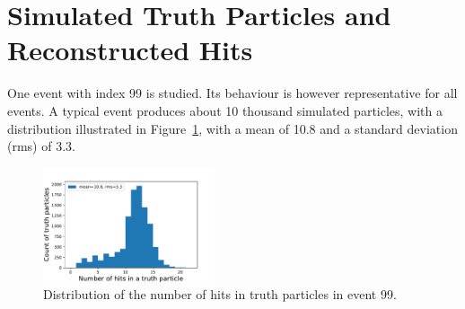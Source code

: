 \section{Simulated Truth Particles and Reconstructed Hits}

One event with index 99 is studied. Its behaviour is however representative for all events. A typical event produces about 10 thousand simulated particles, with a distribution illustrated in Figure~\ref{fig:TruthParticleNbHits}, with a mean of 10.8 and a standard deviation (rms) of 3.3.

\begin{figure}[htb]
\centering
\includegraphics[width=0.45\textwidth]{plots/DataExploration_histo_counterTruthParticles_vs_nbHitsInTruthParticle.pdf}
\caption{Distribution of the number of hits in truth particles in event 99.}
\label{fig:TruthParticleNbHits}
\end{figure}


